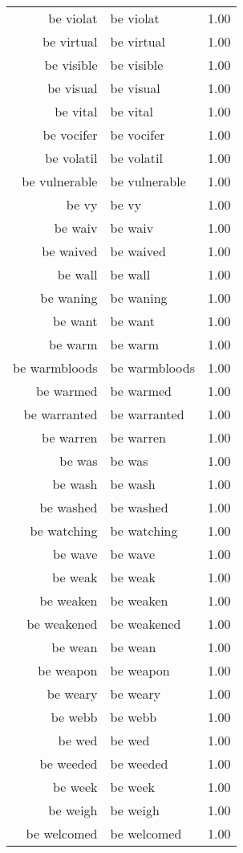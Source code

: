 \begin{table}[ht]
\begin{tabular}{rlr}
  be violat & be violat & 1.00 \\ 
  be virtual & be virtual & 1.00 \\ 
  be visible & be visible & 1.00 \\ 
  be visual & be visual & 1.00 \\ 
  be vital & be vital & 1.00 \\ 
  be vocifer & be vocifer & 1.00 \\ 
  be volatil & be volatil & 1.00 \\ 
  be vulnerable & be vulnerable & 1.00 \\ 
  be vy & be vy & 1.00 \\ 
  be waiv & be waiv & 1.00 \\ 
  be waived & be waived & 1.00 \\ 
  be wall & be wall & 1.00 \\ 
  be waning & be waning & 1.00 \\ 
  be want & be want & 1.00 \\ 
  be warm & be warm & 1.00 \\ 
  be warmbloods & be warmbloods & 1.00 \\ 
  be warmed & be warmed & 1.00 \\ 
  be warranted & be warranted & 1.00 \\ 
  be warren & be warren & 1.00 \\ 
  be was & be was & 1.00 \\ 
  be wash & be wash & 1.00 \\ 
  be washed & be washed & 1.00 \\ 
  be watching & be watching & 1.00 \\ 
  be wave & be wave & 1.00 \\ 
  be weak & be weak & 1.00 \\ 
  be weaken & be weaken & 1.00 \\ 
  be weakened & be weakened & 1.00 \\ 
  be wean & be wean & 1.00 \\ 
  be weapon & be weapon & 1.00 \\ 
  be weary & be weary & 1.00 \\ 
  be webb & be webb & 1.00 \\ 
  be wed & be wed & 1.00 \\ 
  be weeded & be weeded & 1.00 \\ 
  be week & be week & 1.00 \\ 
  be weigh & be weigh & 1.00 \\ 
  be welcomed & be welcomed & 1.00 \\ 

\end{tabular}
\end{table}
